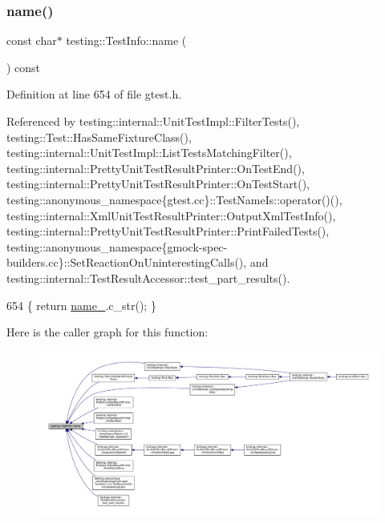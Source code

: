 \subsubsection{\texorpdfstring{name()}{name()}}
{\footnotesize\ttfamily const char$\ast$ testing\+::\+Test\+Info\+::name (\begin{DoxyParamCaption}{ }\end{DoxyParamCaption}) const\hspace{0.3cm}{\ttfamily [inline]}}



Definition at line 654 of file gtest.\+h.



Referenced by testing\+::internal\+::\+Unit\+Test\+Impl\+::\+Filter\+Tests(), testing\+::\+Test\+::\+Has\+Same\+Fixture\+Class(), testing\+::internal\+::\+Unit\+Test\+Impl\+::\+List\+Tests\+Matching\+Filter(), testing\+::internal\+::\+Pretty\+Unit\+Test\+Result\+Printer\+::\+On\+Test\+End(), testing\+::internal\+::\+Pretty\+Unit\+Test\+Result\+Printer\+::\+On\+Test\+Start(), testing\+::anonymous\+\_\+namespace\{gtest.\+cc\}\+::\+Test\+Name\+Is\+::operator()(), testing\+::internal\+::\+Xml\+Unit\+Test\+Result\+Printer\+::\+Output\+Xml\+Test\+Info(), testing\+::internal\+::\+Pretty\+Unit\+Test\+Result\+Printer\+::\+Print\+Failed\+Tests(), testing\+::anonymous\+\_\+namespace\{gmock-\/spec-\/builders.\+cc\}\+::\+Set\+Reaction\+On\+Uninteresting\+Calls(), and testing\+::internal\+::\+Test\+Result\+Accessor\+::test\+\_\+part\+\_\+results().


\begin{DoxyCode}
654 \{ \textcolor{keywordflow}{return} \hyperlink{classtesting_1_1TestInfo_a6bed52b7c3d66c8c5eac5fa2aaadba55}{name\_}.c\_str(); \}
\end{DoxyCode}
Here is the caller graph for this function\+:
\nopagebreak
\begin{figure}[H]
\begin{center}
\leavevmode
\includegraphics[width=350pt]{classtesting_1_1TestInfo_ac2581b45eccc9a3b94cb41c4807d0e34_icgraph}
\end{center}
\end{figure}
\mbox{\label{classtesting_1_1TestInfo_aee8cb884c95cd446129aba936b4159e0}} 
